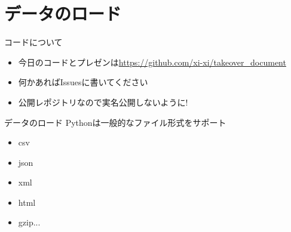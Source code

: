 \documentclass[12pt, dvipdfmx]{beamer}
\begin{document}
\section{データのロード}
\begin{frame}{コードについて}
    \begin{itemize}
        \item 今日のコードとプレゼンは\href{https://github.com/xi-xi/takeover_document}{https://github.com/xi-xi/takeover\_document}

        \item \alert{何かあればIssuesに書いてください}
        \item 公開レポジトリなので実名公開しないように!
    \end{itemize}
\end{frame}
\begin{frame}{データのロード}
    Pythonは一般的なファイル形式をサポート
    \begin{itemize}
        \item \alert<2>{csv}
        \item \alert<2>{json}
        \item xml
        \item html
        \item gzip...
    \end{itemize}
\end{frame}
\end{document}
